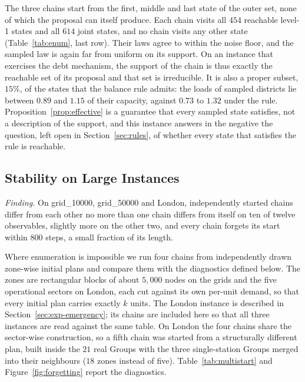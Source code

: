 The three chains start from the first, middle and last state of the outer set, none of which the proposal can itself produce. Each chain visits all $454$ reachable level-1 states and all $614$ joint states, and no chain visits any other state (Table~\ref{tab:enum}, last row). Their laws agree to within the noise floor, and the sampled law is again far from uniform on its support. On an instance that exercises the debt mechanism, the support of the chain is thus exactly the reachable set of its proposal and that set is irreducible. It is also a proper subset, $15\%$, of the states that the balance rule admits: the loads of sampled districts lie between $0.89$ and $1.15$ of their capacity, against $0.73$ to $1.32$ under the rule. Proposition~\ref{prop:effective} is a guarantee that every sampled state satisfies, not a description of the support, and this instance answers in the negative the question, left open in Section~\ref{sec:rules}, of whether every state that satisfies the rule is reachable.

\subsection{Stability on Large Instances}
\label{sec:exp-multistart}

\emph{Finding.} On grid\_10000, grid\_50000 and London, independently started chains differ from each other no more than one chain differs from itself on ten of twelve observables, slightly more on the other two, and every chain forgets its start within $800$ steps, a small fraction of its length.

Where enumeration is impossible we run four chains from independently drawn zone-wise initial plans and compare them with the diagnostics defined below. The zones are rectangular blocks of about $5{,}000$ nodes on the grids and the five operational sectors on London, each cut against its own per-unit demand, so that every initial plan carries exactly $k$ units. The London instance is described in Section~\ref{sec:exp-emergency}; its chains are included here so that all three instances are read against the same table. On London the four chains share the sector-wise construction, so a fifth chain was started from a structurally different plan, built inside the $21$ real Groups with the three single-station Groups merged into their neighbours ($18$ zones instead of five). Table~\ref{tab:multistart} and Figure~\ref{fig:forgetting} report the diagnostics.

